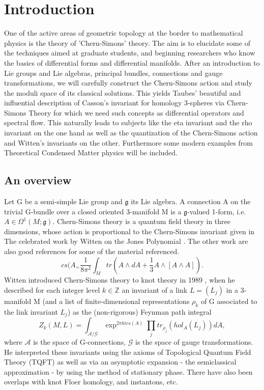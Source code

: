 \section{Introduction}
One of the active areas of geometric topology at the border to mathematical physics is the theory of 'Chern-Simons' theory.
The aim is to elucidate some of the techniques aimed at graduate students, and beginning researchers who know the basics
of differential forms and differential manifolds. 
 After an introduction to Lie groups and Lie algebras, principal bundles, connections and gauge transformations,
 we will carefully construct the Chern-Simons action and study the moduli space of its classical solutions. 
 This yields Taubes' beautiful and influential description of Casson's invariant for homology 3-spheres via
 Chern-Simons Theory for which we need such concepts as differential operators and spectral flow. This naturally
 leads to subjects like the eta invariant and the rho invariant on the one hand as well as the quantization of the
 Chern-Simons action and Witten's invariants on the other.
 Furthermore some modern examples from Theoretical Condensed Matter physics will be included. 
 \subsection{An overview}
 Let G be a semi-simple Lie group and $\mathfrak{g}$ its Lie algebra. A connection A on the trivial G-bundle over a 
 closed oriented 3-manifold M is a $\mathfrak{g}$-valued 1-form, i.e. $A \in \Omega^1(M;\mathfrak{g})$.
 Chern-Simons theory is a quantum field theory in three dimensions, whose action is proportional to the Chern-Simons
 invariant given in \cite{Chern1974}
    The celebrated work by Witten on the Jones Polynomial \cite{Witten:1988hf}.
The other work \cite{donaldson1997geometry,Tong:2005un} are also good references for some of the material referenced.
\begin{equation*}
 cs(A_ = \dfrac{1}{8\pi^{2}} \int_M tr(A \wedge dA + \dfrac{1}{3}A \wedge [A \wedge A]).
\end{equation*}
Witten introduced Chern-Simons theory to knot theory in 1989 \cite{Witten:1988hf}, when he described for each integer 
level $k \in \mathbb{Z}$ an invariant of a link $L = (L_{j})$ in a 3-manifold M (and a list of finite-dimensional 
representations $\rho_k$ of G associated to the link invariant $L_j$) as the (non-rigorous) Feynman path integral
\begin{equation*}
 Z_k(M,L) = \int_{\mathcal{A}/\mathcal{G}} \exp^{2\pi ki cs(A)} \prod_{j} tr_{\rho_{j}} (hol_A(L_j))dA,
\end{equation*}
where $\mathcal{A}$ is the space of G-connections, $\mathcal{G}$ is the space of gauge transformations. He interpreted
these invariants using the axioms of Topological Quantum Field Theory (TQFT) as well as via an asymptotic expansion
- the semiclassical approximation - by using the method of stationary phase. 
There have also been overlaps with knot Floer homology, and instantons, etc.
 
